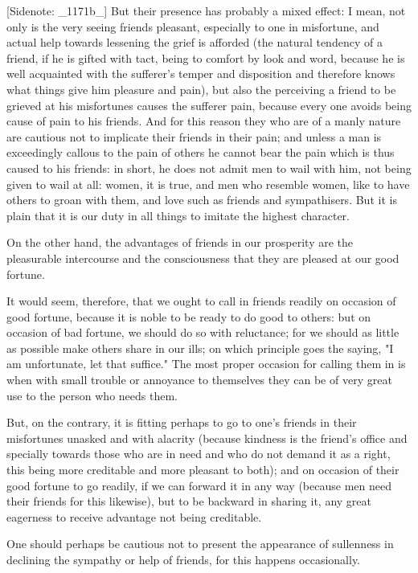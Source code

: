 [Sidenote: _1171b_] But their presence has probably a mixed effect: I
mean, not only is the very seeing friends pleasant, especially to one in
misfortune, and actual help towards lessening the grief is afforded
(the natural tendency of a friend, if he is gifted with tact, being
to comfort by look and word, because he is well acquainted with the
sufferer's temper and disposition and therefore knows what things give
him pleasure and pain), but also the perceiving a friend to be grieved
at his misfortunes causes the sufferer pain, because every one avoids
being cause of pain to his friends. And for this reason they who are
of a manly nature are cautious not to implicate their friends in their
pain; and unless a man is exceedingly callous to the pain of others he
cannot bear the pain which is thus caused to his friends: in short, he
does not admit men to wail with him, not being given to wail at all:
women, it is true, and men who resemble women, like to have others to
groan with them, and love such as friends and sympathisers. But it
is plain that it is our duty in all things to imitate the highest
character.

On the other hand, the advantages of friends in our prosperity are the
pleasurable intercourse and the consciousness that they are pleased at
our good fortune.

It would seem, therefore, that we ought to call in friends readily on
occasion of good fortune, because it is noble to be ready to do good to
others: but on occasion of bad fortune, we should do so with reluctance;
for we should as little as possible make others share in our ills; on
which principle goes the saying, "I am unfortunate, let that suffice."
The most proper occasion for calling them in is when with small trouble
or annoyance to themselves they can be of very great use to the person
who needs them.

But, on the contrary, it is fitting perhaps to go to one's friends in
their misfortunes unasked and with alacrity (because kindness is the
friend's office and specially towards those who are in need and who do
not demand it as a right, this being more creditable and more pleasant
to both); and on occasion of their good fortune to go readily, if we
can forward it in any way (because men need their friends for this
likewise), but to be backward in sharing it, any great eagerness to
receive advantage not being creditable.

One should perhaps be cautious not to present the appearance of
sullenness in declining the sympathy or help of friends, for this
happens occasionally.


